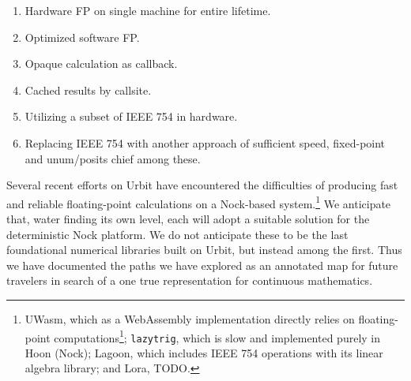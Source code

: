 \documentclass[twoside]{article}
\begin{document}
\begin{enumerate}
  \item  Hardware FP on single machine for entire lifetime.
  \item  Optimized software FP.
  \item  Opaque calculation as callback.
  \item  Cached results by callsite.
  \item  Utilizing a subset of IEEE 754 in hardware.
  \item  Replacing IEEE 754 with another approach of sufficient speed, fixed-point and unum/posits chief among these.
\end{enumerate}

Several recent efforts on Urbit have encountered the difficulties of producing fast and reliable floating-point calculations on a Nock-based system.\footnote{UWasm, which as a WebAssembly implementation directly relies on floating-point computations\footnote{TODO.  See e.g. \citet{KloudKoder2022} for a discussion of the issues involved.}; \texttt{lazytrig}, which is slow and implemented purely in Hoon (Nock); Lagoon, which includes IEEE 754 operations with its linear algebra library; and Lora, TODO.}  We anticipate that, water finding its own level, each will adopt a suitable solution for the deterministic Nock platform.  We do not anticipate these to be the last foundational numerical libraries built on Urbit, but instead among the first.  Thus we have documented the paths we have explored as an annotated map for future travelers in search of a one true representation for continuous mathematics.

\backmatter


\end{document}
